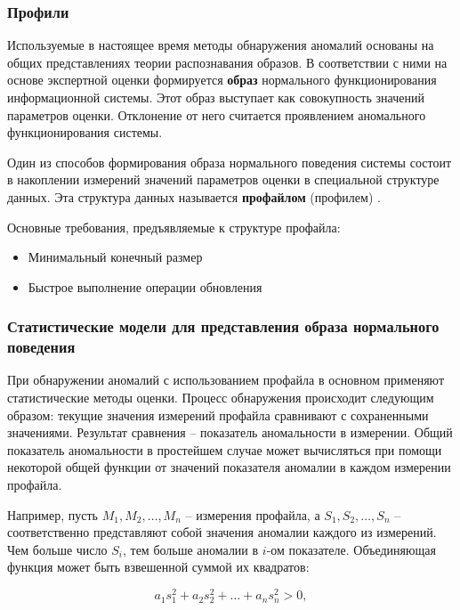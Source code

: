 \subsubsection{Профили}

Используемые в настоящее время методы обнаружения аномалий основаны на общих представлениях теории распознавания образов. В соответствии с ними на основе экспертной оценки формируется \textbf{образ} нормального функционирования информационной системы. Этот образ выступает как совокупность значений параметров оценки. Отклонение от него считается проявлением аномального функционирования системы.

Один из способов формирования образа нормального поведения системы состоит в накоплении измерений значений параметров оценки в специальной структуре данных. Эта структура данных называется \textbf{профайлом} (профилем) \autocite{IDSystem}.

Основные требования, предъявляемые к структуре профайла:
\begin{itemize}
	\item Минимальный конечный размер

	\item Быстрое выполнение операции обновления
\end{itemize}



\subsubsection{Статистические модели для представления образа нормального поведения}

При обнаружении аномалий с использованием профайла в основном применяют статистические
методы оценки. Процесс обнаружения происходит следующим образом: текущие значения измерений
профайла сравнивают с сохраненными значениями. Результат сравнения -- показатель аномальности
в измерении. Общий показатель аномальности в простейшем случае может вычисляться при помощи
некоторой общей функции от значений показателя аномалии в каждом измерении профайла.

Например, пусть $M_1, M_2, \dots, M_n$ -- измерения профайла, а $S_1, S_2, \dots, S_n$ --
соответственно представляют собой значения аномалии каждого из измерений. Чем больше
число $S_i$, тем больше аномалии в $i$-ом показателе. Объединяющая функция может быть
взвешенной суммой их квадратов:

\begin{equation}
	a_1s_1^2 + a_2s_2^2 + \dots + a_ns_n^2 > 0,
\end{equation}

